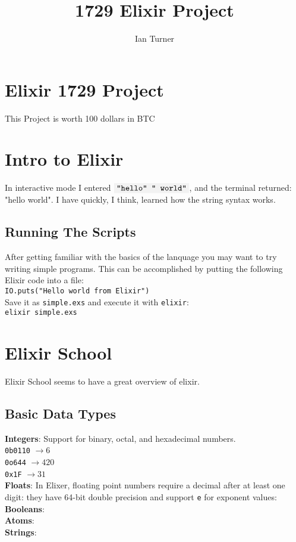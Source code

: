 \documentclass{article}
\title{1729 Elixir Project}
\author{Ian Turner}
\newcommand{\code}[1]{\colorbox{light-gray}{\texttt{#1}}}
\begin{document}
\maketitle

\section*{Elixir 1729 Project}
This Project is worth 100 dollars in BTC

\section*{Intro to Elixir}
In interactive mode I entered $\code{"hello" " world"}$, and the terminal
returned: "hello world". I have quickly, I think, learned how the string
syntax works.

\subsection*{Running The Scripts}
After getting familiar with the basics of the lanquage you may want to try
writing simple programs. This can be accomplished by putting the following
Elixir code into a file:\\
\code{IO.puts("Hello world from Elixir")}\\
Save it as \code{simple.exs} and execute it with \code{elixir}:\\
\code{elixir simple.exs}

\section*{Elixir School}
Elixir School seems to have a great overview of elixir.

\subsection*{Basic Data Types}
\textbf{Integers}: Support for binary, octal, and hexadecimal numbers.\\
\code{0b0110} $\rightarrow 6$\\
\code{0o644} $\rightarrow 420$\\
\code{0x1F} $\rightarrow 31$\\
\textbf{Floats}: In Elixer, floating point numbers require a decimal after at
least one digit: they have 64-bit double precision and support \code{e} for
exponent values:\\
\textbf{Booleans}:\\
\textbf{Atoms}:\\
\textbf{Strings}:
\end{document}
